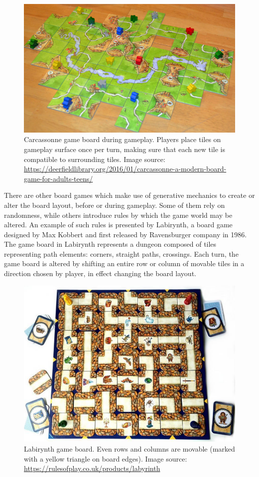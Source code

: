 \documentclass[12pt]{report}
\begin{document}
\begin{figure}[h]
	\centering
	\includegraphics[width=0.7\linewidth]{images/carcassonne}
	\caption{Carcassonne game board during gameplay. Players place tiles on gameplay surface once per turn, making sure that each new tile is compatible to surrounding tiles. Image source: \url{https://deerfieldlibrary.org/2016/01/carcassonne-a-modern-board-game-for-adults-teens/}}
	\label{fig:carcassonne}
\end{figure}

There are other board games which make use of generative mechanics to create or alter the board layout, before or during gameplay. Some of them rely on randomness, while others introduce rules by which the game world may be altered. An example of such rules is presented by Labirynth, a board game designed by Max Kobbert and first released by Ravensburger company in 1986. The game board in Labirynth represents a dungeon composed of tiles representing path elements: corners, straight paths, crossings. Each turn, the game board is altered by shifting an entire row or column of movable tiles in a direction chosen by player, in effect changing the board layout.  

 \begin{figure}[h]
 	\centering
 	\includegraphics[width=0.7\linewidth]{images/labirynth}
 	\caption{Labirynth game board. Even rows and columns are movable (marked with a yellow triangle on board edges). Image source: \url{https://rulesofplay.co.uk/products/labyrinth} }
 	\label{fig:carcassonne}
 \end{figure}
\end{document}
